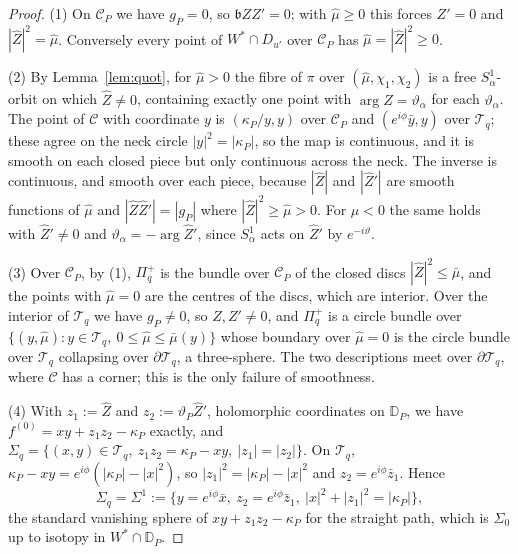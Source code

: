 \begin{proof}
(1) On $\mathscr C_P$ we have $g_P=0$, so $\mathfrak bZZ'=0$; with $\hat\mu\ge0$ this forces $Z'=0$ and $|\hat Z|^2=\hat\mu$.
Conversely every point of $W^*\cap D_{u'}$ over $\mathscr C_P$ has $\hat\mu=|\hat Z|^2\ge0$.

(2) By Lemma~\ref{lem:quot}, for $\hat\mu>0$ the fibre of $\pi$ over $(\hat\mu,\chi_1,\chi_2)$ is a free $S^1_\alpha$-orbit
on which $\hat Z\neq0$, containing exactly one point with $\arg\hat Z=\vartheta_\alpha$ for each $\vartheta_\alpha$. The point of $\mathscr C$
with coordinate $y$ is $(\kappa_P/y,y)$ over $\mathscr C_P$ and $(e^{i\phi}\bar y,y)$ over $\mathscr T_q$; these agree on the
neck circle $|y|^2=|\kappa_P|$, so the map is continuous, and it is smooth on each closed piece but only continuous across
the neck. The inverse is continuous, and smooth over each piece, because $|\hat Z|$ and $|\hat Z'|$ are smooth functions
of $\hat\mu$ and $|\hat Z\hat Z'|=|g_P|$ where $|\hat Z|^2\ge\hat\mu>0$. For $\hat\mu<0$ the same holds with $\hat Z'\ne0$
and $\vartheta_\alpha=-\arg\hat Z'$, since $S^1_\alpha$ acts on $\hat Z'$ by $e^{-i\vartheta}$.

(3) Over $\mathscr C_P$, by (1), $\Pi_q^+$ is the bundle over $\mathscr C_P$ of the closed discs $|\hat Z|^2\le\bar\mu$, and
the points with $\hat\mu=0$ are the centres of the discs, which are interior. Over the interior of $\mathscr T_q$ we have
$g_P\ne0$, so $Z,Z'\ne0$, and $\Pi_q^+$ is a circle bundle over
$\{(y,\hat\mu):y\in\mathscr T_q,\ 0\le\hat\mu\le\bar\mu(y)\}$ whose boundary over $\hat\mu=0$ is the circle bundle over
$\mathscr T_q$ collapsing over $\partial\mathscr T_q$, a three-sphere. The two descriptions meet over $\partial\mathscr T_q$,
where $\mathscr C$ has a corner; this is the only failure of smoothness.

(4) With $z_1:=\hat Z$ and $z_2:=\vartheta_P\hat Z'$, holomorphic coordinates on $\mathbb D_P$, we have
$f^{(0)}=xy+z_1z_2-\kappa_P$ exactly, and $\Sigma_q=\{(x,y)\in\mathscr T_q,\ z_1z_2=\kappa_P-xy,\ |z_1|=|z_2|\}$. On
$\mathscr T_q$, $\kappa_P-xy=e^{i\phi}(|\kappa_P|-|x|^2)$, so $|z_1|^2=|\kappa_P|-|x|^2$ and $z_2=e^{i\phi}\bar z_1$. Hence
\[
\Sigma_q=\Sigma^1:=\{y=e^{i\phi}\bar x,\ z_2=e^{i\phi}\bar z_1,\ |x|^2+|z_1|^2=|\kappa_P|\},
\]
the standard vanishing sphere of $xy+z_1z_2-\kappa_P$ for the straight path, which is $\Sigma_0$ up to isotopy in
$W^*\cap\mathbb D_P$.
\end{proof}

